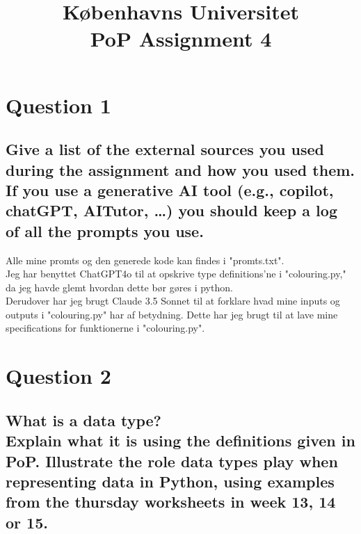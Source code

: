 \documentclass[a4paper,12pt]{article}
\begin{document}
% 

\title{Københavns Universitet\\
PoP Assignment 4}
\maketitle %

\section{Question 1}

\subsection[External sources]{Give a list of the external sources you used during the assignment and how you used them.
If you use a generative AI tool (e.g., copilot, chatGPT, AITutor, \ldots) you should keep a log of all the prompts you use.}

Alle mine promts og den generede kode kan findes i "promts.txt".\\
Jeg har benyttet ChatGPT4o til at opskrive type definitions'ne i "colouring.py," da jeg havde glemt hvordan dette bør gøres i python.\\
Derudover har jeg brugt Claude 3.5 Sonnet til at forklare hvad mine inputs og outputs i "colouring.py" har af betydning. Dette har jeg brugt til at lave mine specifications for funktionerne i "colouring.py".

\section{Question 2}

\subsection[What is a data type?]{What is a data type?\\
Explain what it is using the definitions given in PoP.
Illustrate the role data types play when representing data in Python, using examples from the thursday worksheets in week 13, 14 or 15.}
\end{document}
